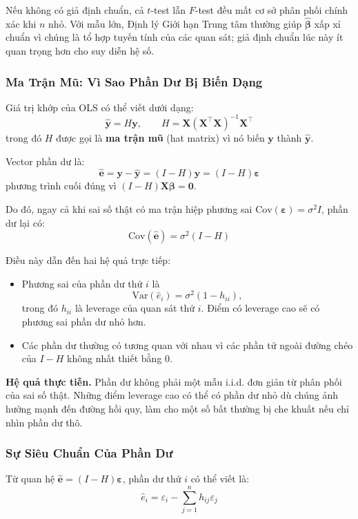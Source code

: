 Nếu không có giả định chuẩn, cả $t$-test lẫn $F$-test đều mất cơ sở phân phối chính xác khi $n$ nhỏ. Với mẫu lớn, Định lý Giới hạn Trung tâm thường giúp $\hat{\boldsymbol{\beta}}$ xấp xỉ chuẩn vì chúng là tổ hợp tuyến tính của các quan sát; giả định chuẩn lúc này ít quan trọng hơn cho suy diễn hệ số.

\subsubsection{Ma Trận Mũ: Vì Sao Phần Dư Bị Biến Dạng}

Giá trị khớp của OLS có thể viết dưới dạng:
\[
  \hat{\mathbf{y}} = H\mathbf{y},
  \qquad
  H = \mathbf{X}(\mathbf{X}^\top\mathbf{X})^{-1}\mathbf{X}^\top
\]
trong đó $H$ được gọi là \textbf{ma trận mũ} (hat matrix) vì nó biến $\mathbf{y}$ thành $\hat{\mathbf{y}}$.

Vector phần dư là:
\[
  \hat{\mathbf{e}}
  = \mathbf{y} - \hat{\mathbf{y}}
  = (I-H)\mathbf{y}
  = (I-H)\boldsymbol{\varepsilon}
\]
phương trình cuối đúng vì $(I-H)\mathbf{X}\boldsymbol{\beta} = \mathbf{0}$.

Do đó, ngay cả khi sai số thật có ma trận hiệp phương sai $\mathrm{Cov}(\boldsymbol{\varepsilon}) = \sigma^2 I$, phần dư lại có:
\[
  \mathrm{Cov}(\hat{\mathbf{e}}) = \sigma^2(I-H)
\]

Điều này dẫn đến hai hệ quả trực tiếp:
\begin{itemize}
  \item Phương sai của phần dư thứ $i$ là
  \[
    \mathrm{Var}(\hat e_i) = \sigma^2(1-h_{ii}),
  \]
  trong đó $h_{ii}$ là leverage của quan sát thứ $i$. Điểm có leverage cao sẽ có phương sai phần dư nhỏ hơn.
  \item Các phần dư thường có tương quan với nhau vì các phần tử ngoài đường chéo của $I-H$ không nhất thiết bằng 0.
\end{itemize}

\textbf{Hệ quả thực tiễn.} Phần dư không phải một mẫu i.i.d. đơn giản từ phân phối của sai số thật. Những điểm leverage cao có thể có phần dư nhỏ dù chúng ảnh hưởng mạnh đến đường hồi quy, làm cho một số bất thường bị che khuất nếu chỉ nhìn phần dư thô.

\subsubsection{Sự Siêu Chuẩn Của Phần Dư}

Từ quan hệ $\hat{\mathbf{e}} = (I-H)\boldsymbol{\varepsilon}$, phần dư thứ $i$ có thể viết là:
\[
  \hat e_i = \varepsilon_i - \sum_{j=1}^{n} h_{ij}\varepsilon_j
\]

